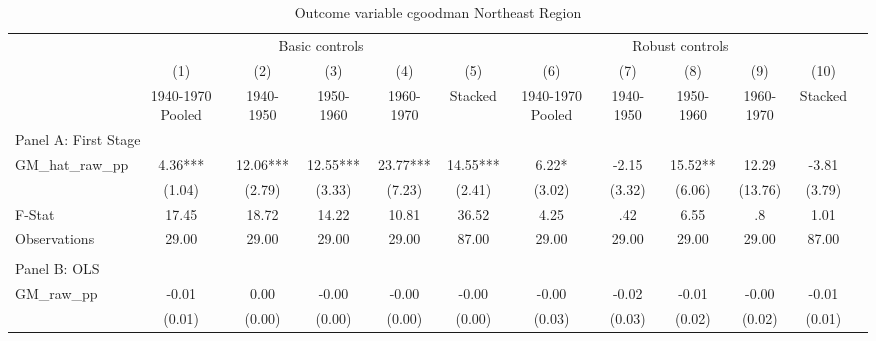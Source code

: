  \begin{table}[htbp]\centering {} \begin{threeparttable} \caption{Outcome variable cgoodman Northeast Region} \begin{tabular}{l*{11}{c}} \toprule
          &\multicolumn{5}{c}{Basic controls}                                   &\multicolumn{5}{c}{Robust controls}                                  \\\cmidrule(lr){2-6}\cmidrule(lr){7-11}
          &\multicolumn{1}{c}{(1)}&\multicolumn{1}{c}{(2)}&\multicolumn{1}{c}{(3)}&\multicolumn{1}{c}{(4)}&\multicolumn{1}{c}{(5)}&\multicolumn{1}{c}{(6)}&\multicolumn{1}{c}{(7)}&\multicolumn{1}{c}{(8)}&\multicolumn{1}{c}{(9)}&\multicolumn{1}{c}{(10)}\\
          &\multicolumn{1}{c}{1940-1970 Pooled}&\multicolumn{1}{c}{1940-1950}&\multicolumn{1}{c}{1950-1960}&\multicolumn{1}{c}{1960-1970}&\multicolumn{1}{c}{Stacked}&\multicolumn{1}{c}{1940-1970 Pooled}&\multicolumn{1}{c}{1940-1950}&\multicolumn{1}{c}{1950-1960}&\multicolumn{1}{c}{1960-1970}&\multicolumn{1}{c}{Stacked}\\
\cmidrule(lr){1-11}
\multicolumn{10}{l}{Panel A: First Stage}\\
\cmidrule(lr){1-11}
GM\_hat\_raw\_pp&      4.36***&     12.06***&     12.55***&     23.77***&     14.55***&      6.22*  &     -2.15   &     15.52** &     12.29   &     -3.81   \\
          &    (1.04)   &    (2.79)   &    (3.33)   &    (7.23)   &    (2.41)   &    (3.02)   &    (3.32)   &    (6.06)   &   (13.76)   &    (3.79)   \\
\midrule
F-Stat    &     17.45   &     18.72   &     14.22   &     10.81   &     36.52   &      4.25   &       .42   &      6.55   &        .8   &      1.01   \\
Observations&     29.00   &     29.00   &     29.00   &     29.00   &     87.00   &     29.00   &     29.00   &     29.00   &     29.00   &     87.00   \\
\cmidrule[\heavyrulewidth](lr){1-11} \\ \cmidrule[\heavyrulewidth](lr){1-11}
\multicolumn{10}{l}{Panel B: OLS}\\
\cmidrule(lr){1-11}
GM\_raw\_pp &     -0.01   &      0.00   &     -0.00   &     -0.00   &     -0.00   &     -0.00   &     -0.02   &     -0.01   &     -0.00   &     -0.01   \\
          &    (0.01)   &    (0.00)   &    (0.00)   &    (0.00)   &    (0.00)   &    (0.03)   &    (0.03)   &    (0.02)   &    (0.02)   &    (0.01)   \\

\end{tabular}
\end{threeparttable}
\end{table}
